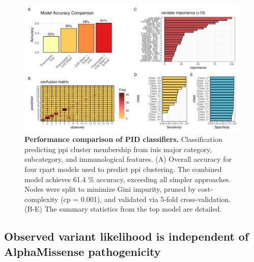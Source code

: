 \begin{figure}[h]
  \centering
  \includegraphics[width=0.99\textwidth]{../images/plot_multicat_performance_combined.pdf}
  \caption{\textbf{Performance comparison of PID classifiers.} Classification predicting \ac{ppi} cluster membership from \ac{iuis} major category, subcategory, and immunological features. (A) Overall accuracy for four rpart models
used to predict \ac{ppi} clustering. The combined model achieves 61.4 \% accuracy, exceeding all simpler approaches. 
Nodes were split to minimize Gini impurity, pruned by cost-complexity (cp = 0.001), and validated via 5‑fold cross‑validation. %
(B-E) The summary statistics from the top model are detailed.  
}
  \label{fig:multicat_performance_combined}
\end{figure}


\clearpage

\subsection{Observed variant likelihood is independent of AlphaMissense pathogenicity}

